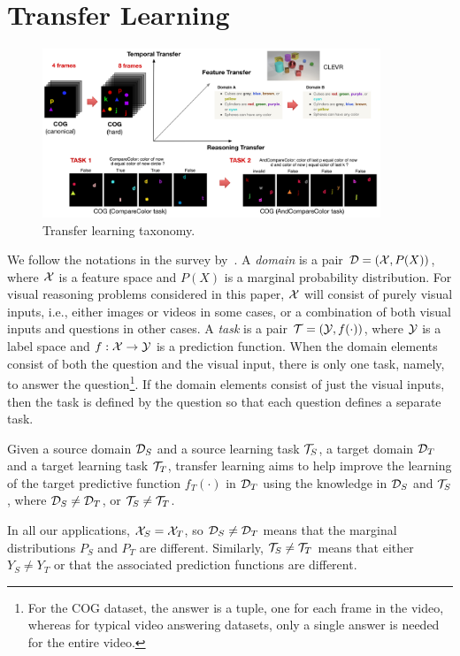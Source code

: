 \section{Transfer Learning}

\begin{figure}
	\centering
	\includegraphics[width=0.9\textwidth]{img/architecture/transfer_taxo}
	\caption{Transfer learning taxonomy.}\label{fig:taskonomy}
\end{figure}

We follow the notations in the survey by~\cite{pan2009survey}.
A \emph{domain} is a pair $\mathcal{D} = (\mathcal{X},P(X))$, where $\mathcal{X}$ is a feature space and $P(X)$ is a marginal probability distribution.
For visual reasoning problems considered in this paper, 
$\mathcal{X}$ will consist of purely visual inputs, i.e., either images or videos in some cases, or 
a combination of both visual inputs and questions in other cases. 
A \emph{task} is a pair $\mathcal{T}= (\mathcal{Y},f(\cdot))$, where $\mathcal{Y}$ is a label space and $f: \mathcal{X} \to \mathcal{Y}$ is a prediction function. 
When the domain elements consist of both the question and the visual input, there is only one task, namely, to answer the 
question\footnote{%
	For the COG dataset, the answer is a tuple, one for each frame in the video, whereas for typical video answering datasets,
	only a single answer is needed for the entire video.}. %
If the domain elements consist of just the visual inputs, then the task is defined by the question so that each question 
defines a separate task.
\begin{definition}
	\label{defn:transfer}
	Given a source domain $\mathcal{D}_S$ and a source learning task $\mathcal{T}_S$, a target domain $\mathcal{D}_T$ and a target learning task $\mathcal{T}_T$, transfer learning aims to help improve the 
	learning of the target predictive function $f_T(\cdot)$ in $\mathcal{D}_T$ using the knowledge  in $\mathcal{D}_S$ and $\mathcal{T}_S$, where $\mathcal{D}_S \ne \mathcal{D}_T$, or $\mathcal{T}_S \ne \mathcal{T}_T$.
\end{definition}
In all our applications, $\mathcal{X}_S = \mathcal{X}_T$, so $\mathcal{D}_S \ne \mathcal{D}_T$ means that the marginal distributions $P_S$ and $P_T$ are different.
Similarly, $\mathcal{T}_S \ne \mathcal{T}_T$ means that either $Y_S \ne Y_T$ or that the associated prediction functions are different.

